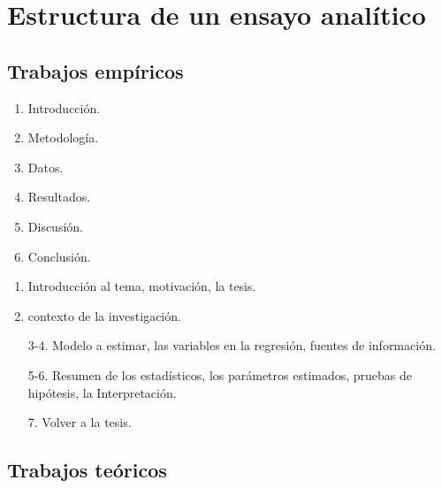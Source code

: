 \section{Estructura de un ensayo analítico}

\subsection{Trabajos empíricos}

\begin{multicols}{2}
    \begin{enumerate}[1.]
	\item Introducción.
	\item Metodología.
	\item Datos.
	\item Resultados.
	\item Discusión.
	\item Conclusión.
    \end{enumerate}

    \begin{enumerate}[1.]
	\item Introducción al tema, motivación, la tesis.
	\item contexto de la investigación.
	\item[3-4.] Modelo a estimar, las variables en la regresión, fuentes de información.
	\item[5-6.] Resumen de los estadísticos, los parámetros estimados, pruebas de hipótesis, la Interpretación.
	\item[7.] Volver a la tesis.
    \end{enumerate}
\end{multicols}

\subsection{Trabajos teóricos}

